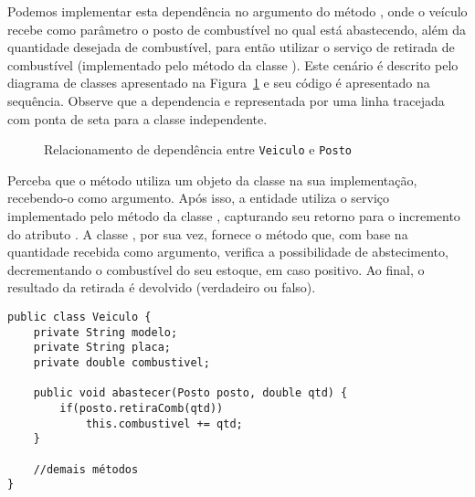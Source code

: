 Podemos implementar esta dependência no argumento do método , onde o veículo recebe como parâmetro o posto de combustível no qual está abastecendo, além da quantidade desejada de combustível, para então utilizar o serviço de retirada de combustível (implementado pelo método  da classe ). Este cenário é descrito pelo diagrama de classes apresentado na Figura~\ref{fig:dependencia-veiculo-posto} e seu código é apresentado na sequência. Observe que a dependencia e representada por uma linha tracejada com ponta de seta para a classe independente.

\begin{figure}[h]
	\centering
	
	
	\caption{Relacionamento de dependência entre \texttt{Veiculo} e \texttt{Posto}}
	\label{fig:dependencia-veiculo-posto}
\end{figure}

Perceba que o método  utiliza um objeto da classe  na sua implementação, recebendo-o como argumento. Após isso, a entidade  utiliza o serviço implementado pelo método  da classe , capturando seu retorno para o incremento do atributo . A classe , por sua vez, fornece o método  que, com base na quantidade recebida como argumento, verifica a possibilidade de abstecimento, decrementando o combustível do seu estoque, em caso positivo. Ao final, o resultado da retirada é devolvido (verdadeiro ou falso).

\begin{verbatim}
public class Veiculo {
	private String modelo;
	private String placa;
	private double combustivel;
	
	public void abastecer(Posto posto, double qtd) {
		if(posto.retiraComb(qtd))
			this.combustivel += qtd;
	}
	
	//demais métodos
}
\end{verbatim}

